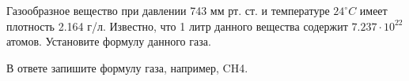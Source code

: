 
Газообразное вещество при давлении 743 мм рт. ст. и температуре $24^{\circ}C$ имеет плотность 2.164 г/л. 
Известно, что 1 литр данного вещества содержит $7.237 \cdot 10^{22}$ атомов. Установите формулу данного газа.

В ответе запишите формулу газа, например, CH4.



